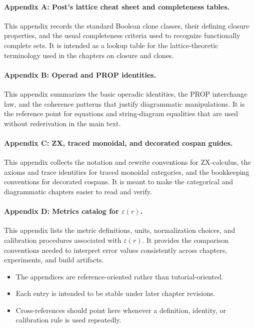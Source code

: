 \documentclass[11pt]{article}
\begin{document}
\paragraph{Appendix A: Post's lattice cheat sheet and completeness tables.} This appendix records the standard Boolean clone classes, their defining closure properties, and the usual completeness criteria used to recognize functionally complete sets. It is intended as a lookup table for the lattice-theoretic terminology used in the chapters on closure and clones.

\paragraph{Appendix B: Operad and PROP identities.} This appendix summarizes the basic operadic identities, the PROP interchange law, and the coherence patterns that justify diagrammatic manipulations. It is the reference point for equations and string-diagram equalities that are used without rederivation in the main text.

\paragraph{Appendix C: ZX, traced monoidal, and decorated cospan guides.} This appendix collects the notation and rewrite conventions for ZX-calculus, the axioms and trace identities for traced monoidal categories, and the bookkeeping conventions for decorated cospans. It is meant to make the categorical and diagrammatic chapters easier to read and verify.

\paragraph{Appendix D: Metrics catalog for $\varepsilon(r)$.} This appendix lists the metric definitions, units, normalization choices, and calibration procedures associated with $\varepsilon(r)$. It provides the comparison conventions needed to interpret error values consistently across chapters, experiments, and build artifacts.

\begin{itemize}
  \item The appendices are reference-oriented rather than tutorial-oriented.
  \item Each entry is intended to be stable under later chapter revisions.
  \item Cross-references should point here whenever a definition, identity, or calibration rule is used repeatedly.
\end{itemize}
\end{document}
